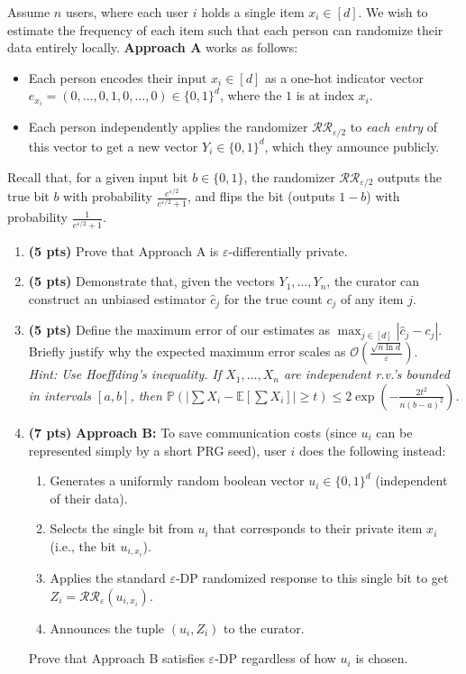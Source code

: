 \documentclass[12pt]{article}
\begin{document}
\begin{enumerate}
Assume $n$ users, where each user $i$ holds a single item $x_i \in [d]$.
We wish to estimate the frequency of each item such that each person can randomize their data entirely locally.
{\bf Approach A} works as follows:
\begin{itemize}
    \item Each person encodes their input $x_i \in [d]$ as a one-hot indicator vector $e_{x_i} = (0, \dots, 0, 1, 0, \dots, 0) \in \{0, 1\}^d$, where the $1$ is at index $x_i$.
    \item Each person independently applies the randomizer $\mathcal{R}\mathcal{R}_{\varepsilon/2}$ to \textit{each entry} of this vector to get a new vector $Y_i \in \{0, 1\}^d$, which they announce publicly.
\end{itemize}
Recall that, for a given input bit $b \in \{0,1\}$, the randomizer $\mathcal{R}\mathcal{R}_{\varepsilon/2}$ outputs the true bit $b$ with probability $\frac{e^{\varepsilon/2}}{e^{\varepsilon/2}+1}$, and flips the bit (outputs $1-b$) with probability $\frac{1}{e^{\varepsilon/2}+1}$.

\begin{enumerate}
    \item[(a)] \textbf{(5 pts)} Prove that Approach A is $\varepsilon$-differentially private.
    
    \item[(b)] \textbf{(5 pts)} Demonstrate that, given the vectors $Y_1, \dots, Y_n$, the curator can construct an unbiased estimator $\hat{c}_j$ for the true count $c_j$ of any item $j$.
    
    \item[(c)] \textbf{(5 pts)} Define the maximum error of our estimates as $\max_{j \in [d]} |\hat{c}_j - c_j|$. Briefly justify why the expected maximum error scales as $\mathcal{O}\left( \frac{\sqrt{n \ln d}}{\varepsilon} \right)$.\\
    \textit{Hint: Use Hoeffding's inequality. If $X_1, \dots, X_n$ are independent r.v.'s bounded in intervals $[a, b]$, then $\mathbb{P}\left(\left|\sum X_i - \mathbb{E}\left[\sum X_i\right]\right| \ge t\right) \le 2 \exp\left(-\frac{2t^2}{n(b-a)^2}\right)$.}
    
    \item[(d)] \textbf{(7 pts)} \textbf{Approach B:} To save communication costs (since $u_i$ can be represented simply by a short PRG seed), user $i$ does the following instead:
    \begin{enumerate}
        \item Generates a uniformly random boolean vector $u_i \in \{0, 1\}^d$ (independent of their data).
        \item Selects the single bit from $u_i$ that corresponds to their private item $x_i$ (i.e., the bit $u_{i, x_i}$).
        \item Applies the standard $\varepsilon$-DP randomized response to this single bit to get $Z_i = \mathcal{R}\mathcal{R}_\varepsilon(u_{i, x_i})$.
        \item Announces the tuple $(u_i, Z_i)$ to the curator.
    \end{enumerate}
    Prove that Approach B satisfies $\varepsilon$-DP regardless of how $u_i$ is chosen.
    

\end{enumerate}
\end{enumerate}
\end{document}
